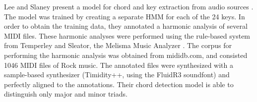 Lee and Slaney present a model for chord and key extraction
from audio sources \textcite{lee2007unified}. The model was
trained by creating a separate HMM for each of the 24 keys.
In order to obtain the training data, they annotated a
harmonic analysis of several MIDI files. These harmonic
analyses were performed using the rule-based system from
Temperley and Sleator, the Melisma Music Analyzer
\textcite{temperley2004cognition}. The corpus for performing
the harmonic analysis was obtained from mididb.com, and
consisted 1046 MIDI files of Rock music. The annotated files
were synthesized with a sample-based synthesizer
(Timidity++, using the FluidR3 soundfont) and perfectly
aligned to the annotations. Their chord detection model is
able to distinguish only major and minor triads.






